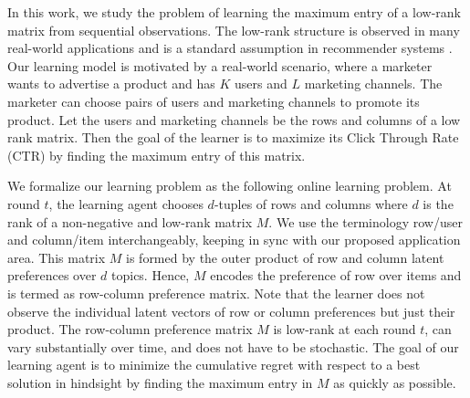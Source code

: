 In this work, we study the problem of learning the maximum entry of a low-rank matrix from sequential observations. The low-rank structure is observed in many real-world applications and is a standard assumption in recommender systems \citep{koren2009matrix,ricci2011liorrokach}. Our learning model is motivated by a real-world scenario, where a marketer wants to advertise a product and has $K$ users and $L$ marketing channels. The marketer can choose pairs of users and marketing channels to promote its product. Let the users and marketing channels be the rows and columns of a low rank matrix. Then the goal of the learner is to maximize its Click Through Rate (CTR) by finding the maximum entry of this matrix.




We formalize our learning problem as the following online learning problem. At round $t$, the learning agent chooses $d$-tuples of rows and columns where $d$ is the rank of a non-negative and low-rank matrix $M$. We use the terminology row/user and column/item interchangeably, keeping in sync with our proposed application area. This matrix $M$ is formed by the outer product of row and column latent preferences over $d$ topics. Hence, $M$ encodes the preference of row over items and is termed as row-column preference matrix. Note that the learner does not observe the individual latent vectors of row or column preferences but just their product. The row-column preference matrix $M$ is low-rank at each round $t$, can vary substantially over time, and does not have to be stochastic. The goal of our learning agent is to minimize the cumulative regret with respect to a best solution in hindsight by finding the maximum entry in $M$ as quickly as possible.




